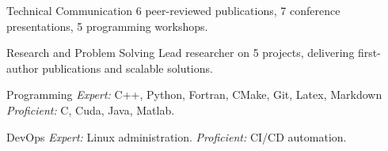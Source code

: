 


\begin{cvskills}


\cvskill
{Technical Communication} %
{6 peer-reviewed publications, 7 conference presentations, 5 programming workshops.} %


\cvskill
{Research and Problem Solving} %
{Lead researcher on 5 projects, delivering first-author publications and scalable solutions. } %


\cvskill
{Programming} %
{\textit{Expert:} C++, Python, Fortran, CMake, Git, Latex, Markdown \textit{Proficient:} C, Cuda, Java, Matlab.} %


\cvskill
{DevOps} %
{\textit{Expert:} Linux administration. \textit{Proficient:} CI/CD automation.}


\end{cvskills}

